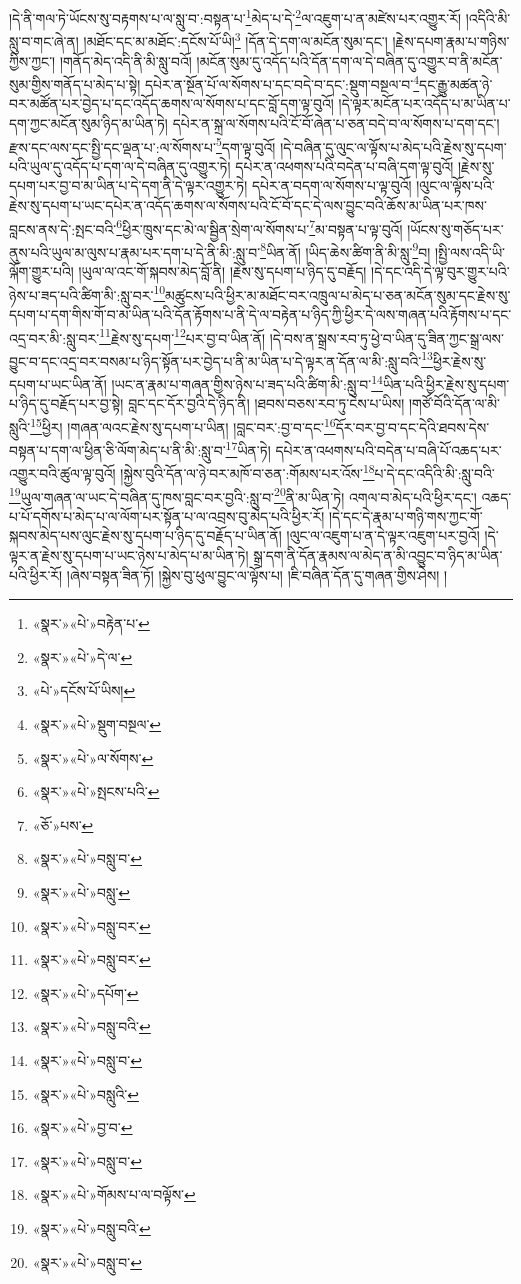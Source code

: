 །དེ་ནི་གལ་ཏེ་ཡོངས་སུ་བརྟགས་པ་ལ་སླུ་བ་:བསྟན་པ་\footnote{«སྣར་»«པེ་»བརྟེན་པ་}མེད་པ་དེ་\footnote{«སྣར་»«པེ་»དེ་ལ་}ལ་འཇུག་པ་ན་མཛེས་པར་འགྱུར་རོ། །འདིའི་མི་སླུ་བ་གང་ཞེ་ན། །མཐོང་དང་མ་མཐོང་:དངོས་པོ་ཡི།\footnote{«པེ་»དངོས་པོ་ཡིས།} །དོན་དེ་དག་ལ་མངོན་སུམ་དང་། །རྗེས་དཔག་རྣམ་པ་གཉིས་ཀྱིས་ཀྱང་། །གནོད་མེད་འདི་ནི་མི་སླུ་བའོ། །མངོན་སུམ་དུ་འདོད་པའི་དོན་དག་ལ་དེ་བཞིན་དུ་འགྱུར་བ་ནི་མངོན་སུམ་གྱིས་གནོད་པ་མེད་པ་སྟེ། དཔེར་ན་སྔོན་པོ་ལ་སོགས་པ་དང་བདེ་བ་དང་:སྡུག་བསྔལ་བ་\footnote{«སྣར་»«པེ་»སྡུག་བསྔལ་}དང་རྒྱུ་མཚན་ཉེ་བར་མཚོན་པར་བྱེད་པ་དང་འདོད་ཆགས་ལ་སོགས་པ་དང་བློ་དག་ལྟ་བུའོ། །དེ་ལྟར་མངོན་པར་འདོད་པ་མ་ཡིན་པ་དག་ཀྱང་མངོན་སུམ་ཉིད་མ་ཡིན་ཏེ། དཔེར་ན་སྐྲ་ལ་སོགས་པའི་ངོ་བོ་ཞེན་པ་ཅན་བདེ་བ་ལ་སོགས་པ་དག་དང་། རྫས་དང་ལས་དང་སྤྱི་དང་ལྡན་པ་:ལ་སོགས་པ་\footnote{«སྣར་»«པེ་»ལ་སོགས་}དག་ལྟ་བུའོ། །དེ་བཞིན་དུ་ལུང་ལ་ལྟོས་པ་མེད་པའི་རྗེས་སུ་དཔག་པའི་ཡུལ་དུ་འདོད་པ་དག་ལ་དེ་བཞིན་དུ་འགྱུར་ཏེ། དཔེར་ན་འཕགས་པའི་བདེན་པ་བཞི་དག་ལྟ་བུའོ། །རྗེས་སུ་དཔག་པར་བྱ་བ་མ་ཡིན་པ་དེ་དག་ནི་དེ་ལྟར་འགྱུར་ཏེ། དཔེར་ན་བདག་ལ་སོགས་པ་ལྟ་བུའོ། །ལུང་ལ་ལྟོས་པའི་རྗེས་སུ་དཔག་པ་ཡང་དཔེར་ན་འདོད་ཆགས་ལ་སོགས་པའི་ངོ་བོ་དང་དེ་ལས་བྱུང་བའི་ཆོས་མ་ཡིན་པར་ཁས་བླངས་ནས་དེ་:སྤང་བའི་\footnote{«སྣར་»«པེ་»སྤངས་པའི་}ཕྱིར་ཁྲུས་དང་མེ་ལ་སྦྱིན་སྲེག་ལ་སོགས་པ་\footnote{«ཅོ་»པས་}མ་བསྟན་པ་ལྟ་བུའོ། །ཡོངས་སུ་གཅོད་པར་ནུས་པའི་ཡུལ་མ་ལུས་པ་རྣམ་པར་དག་པ་དེ་ནི་མི་:སླུ་བ་\footnote{«སྣར་»«པེ་»བསླུ་བ་}ཡིན་ནོ། །ཡིད་ཆེས་ཚིག་ནི་མི་སླུ་\footnote{«སྣར་»«པེ་»བསླུ་}བ། །སྤྱི་ལས་འདི་ཡི་ལྐོག་གྱུར་པའི། །ཡུལ་ལ་འང་གོ་སྐབས་མེད་བློ་ནི། །རྗེས་སུ་དཔག་པ་ཉིད་དུ་བརྗོད། །དེ་དང་འདི་དེ་ལྟ་བུར་གྱུར་པའི་ཉེས་པ་ཟད་པའི་ཚིག་མི་:སླུ་བར་\footnote{«སྣར་»«པེ་»བསླུ་བར་}མཚུངས་པའི་ཕྱིར་མ་མཐོང་བར་འཁྲུལ་པ་མེད་པ་ཅན་མངོན་སུམ་དང་རྗེས་སུ་དཔག་པ་དག་གིས་གོ་བ་མ་ཡིན་པའི་དོན་རྟོགས་པ་ནི་དེ་ལ་བརྟེན་པ་ཉིད་ཀྱི་ཕྱིར་དེ་ལས་གཞན་པའི་རྟོགས་པ་དང་འདྲ་བར་མི་:སླུ་བར་\footnote{«སྣར་»«པེ་»བསླུ་བར་}རྗེས་སུ་དཔག་\footnote{«སྣར་»«པེ་»དཔོག་}པར་བྱ་བ་ཡིན་ནོ། །དེ་བས་ན་སྒྲས་རབ་ཏུ་ཕྱེ་བ་ཡིན་དུ་ཟིན་ཀྱང་སྒྲ་ལས་བྱུང་བ་དང་འདྲ་བར་བསམ་པ་ཉིད་སྟོན་པར་བྱེད་པ་ནི་མ་ཡིན་པ་དེ་ལྟར་ན་དོན་ལ་མི་:སླུ་བའི་\footnote{«སྣར་»«པེ་»བསླུ་བའི་}ཕྱིར་རྗེས་སུ་དཔག་པ་ཡང་ཡིན་ནོ། །ཡང་ན་རྣམ་པ་གཞན་གྱིས་ཉེས་པ་ཟད་པའི་ཚིག་མི་:སླུ་བ་\footnote{«སྣར་»«པེ་»བསླུ་བ་}ཡིན་པའི་ཕྱིར་རྗེས་སུ་དཔག་པ་ཉིད་དུ་བརྗོད་པར་བྱ་སྟེ། བླང་དང་དོར་བྱའི་དེ་ཉིད་ནི། །ཐབས་བཅས་རབ་ཏུ་ངེས་པ་ཡིས། །གཙོ་བོའི་དོན་ལ་མི་སླུའི་\footnote{«སྣར་»«པེ་»བསླུའི་}ཕྱིར། །གཞན་ལའང་རྗེས་སུ་དཔག་པ་ཡིན། །བླང་བར་:བྱ་བ་དང་\footnote{«སྣར་»«པེ་»བྱ་བ་}དོར་བར་བྱ་བ་དང་དེའི་ཐབས་དེས་བསྟན་པ་དག་ལ་ཕྱིན་ཅི་ལོག་མེད་པ་ནི་མི་:སླུ་བ་\footnote{«སྣར་»«པེ་»བསླུ་བ་}ཡིན་ཏེ། དཔེར་ན་འཕགས་པའི་བདེན་པ་བཞི་པོ་འཆད་པར་འགྱུར་བའི་ཚུལ་ལྟ་བུའོ། །སྐྱེས་བུའི་དོན་ལ་ཉེ་བར་མཁོ་བ་ཅན་:གོམས་པར་འོས་\footnote{«སྣར་»«པེ་»གོམས་པ་ལ་བལྟོས་}པ་དེ་དང་འདིའི་མི་:སླུ་བའི་\footnote{«སྣར་»«པེ་»བསླུ་བའི་}ཡུལ་གཞན་ལ་ཡང་དེ་བཞིན་དུ་ཁས་བླང་བར་བྱའི་:སླུ་བ་\footnote{«སྣར་»«པེ་»བསླུ་བ་}ནི་མ་ཡིན་ཏེ། འགལ་བ་མེད་པའི་ཕྱིར་དང་། འཆད་པ་པོ་དགོས་པ་མེད་པ་ལ་ལོག་པར་སྟོན་པ་ལ་འབྲས་བུ་མེད་པའི་ཕྱིར་རོ། །དེ་དང་དེ་རྣམ་པ་གཉི་གས་ཀྱང་གོ་སྐབས་མེད་པས་ལུང་རྗེས་སུ་དཔག་པ་ཉིད་དུ་བརྗོད་པ་ཡིན་ནོ། །ལུང་ལ་འཇུག་པ་ན་དེ་ལྟར་འཇུག་པར་བྱའོ། །དེ་ལྟར་ན་རྗེས་སུ་དཔག་པ་ཡང་ཉེས་པ་མེད་པ་མ་ཡིན་ཏེ། སྒྲ་དག་ནི་དོན་རྣམས་ལ་མེད་ན་མི་འབྱུང་བ་ཉིད་མ་ཡིན་པའི་ཕྱིར་རོ། །ཞེས་བསྟན་ཟིན་ཏོ། །སྐྱེས་བུ་ཕུལ་བྱུང་ལ་ལྟོས་པ། །ཇི་བཞིན་དོན་དུ་གཞན་གྱིས་ཤེས། །
